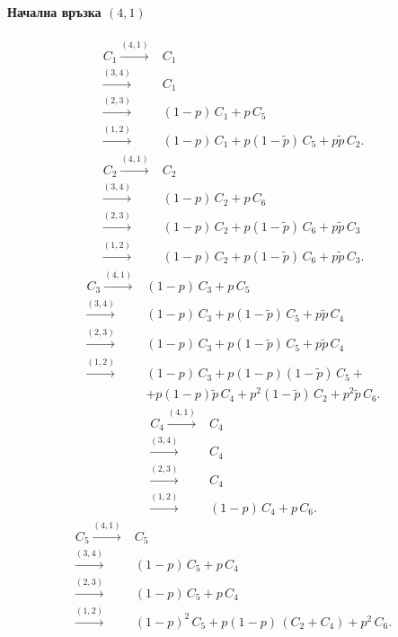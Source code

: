 \documentclass[a4paper,10pt]{article}
\begin{document}
\paragraph{Начална връзка $(4,1)$}
\begin{equation}
\begin{split}
C_1 \xrightarrow{(4,1)}& C_1\\
    \xrightarrow{(3,4)}& C_1\\
    \xrightarrow{(2,3)}& (1-p)\,C_1+p\,C_5\\
    \xrightarrow{(1,2)}& (1-p)\,C_1+p(1-\tilde{p})\,C_5+p\tilde{p}\,C_2.
\end{split}
\end{equation}
%
\begin{equation}
\begin{split}
C_2 \xrightarrow{(4,1)}& C_2\\
    \xrightarrow{(3,4)}& (1-p)\,C_2 + p\,C_6\\
    \xrightarrow{(2,3)}& (1-p)\,C_2 + p(1-\tilde{p})\,C_6 + p\tilde{p}\,C_3\\
    \xrightarrow{(1,2)}& (1-p)\,C_2 + p(1-\tilde{p})\,C_6 + p\tilde{p}\,C_3.
\end{split}
\end{equation}
%
\begin{equation}
\begin{split}
C_3 \xrightarrow{(4,1)}& (1-p)\,C_3 + p\,C_5\\
    \xrightarrow{(3,4)}& (1-p)\,C_3 + p(1-\tilde{p})\,C_5 + p\tilde{p}\,C_4\\
    \xrightarrow{(2,3)}& (1-p)\,C_3 + p(1-\tilde{p})\,C_5 + p\tilde{p}\,C_4\\
    \xrightarrow{(1,2)}& (1-p)\,C_3 + p(1-p)(1-\tilde{p})\,C_5 + \\
    & + p(1-p)\tilde{p}\,C_4 + p^2(1-\tilde{p})\,C_2 + p^2\tilde{p}\,C_6.
\end{split}
\end{equation}
%
\begin{equation}
\begin{split}
C_4 \xrightarrow{(4,1)}& C_4\\
    \xrightarrow{(3,4)}& C_4\\
    \xrightarrow{(2,3)}& C_4\\
    \xrightarrow{(1,2)}& (1-p)\,C_4 + p\,C_6.
\end{split}
\end{equation}
%
\begin{equation}
\begin{split}
C_5 \xrightarrow{(4,1)}& C_5\\
    \xrightarrow{(3,4)}& (1-p)\,C_5 + p\,C_4\\
    \xrightarrow{(2,3)}& (1-p)\,C_5 + p\,C_4\\
    \xrightarrow{(1,2)}& (1-p)^2\,C_5 + p(1-p)\,(C_2 + C_4) + p^2\, C_6.
\end{split}
\end{equation}
\end{document}
